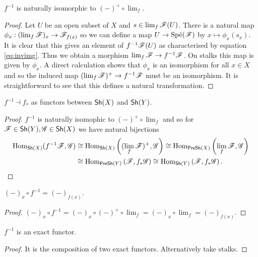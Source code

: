 \documentclass{memoir}
\begin{document}
\begin{thm}
    $f^{-1}$ is naturally isomorphic to $(-)^+\circ \lim_f$.
\end{thm}
\begin{proof}
    Let $U$ be an open subset of $X$ and $s\in\lim_f\mathscr{F}(U)$.
    There is a natural map $\phi_x:(\lim_f\mathscr{F})_x\to\mathscr{F}_{f(x)}$ so we can define a map $U\to\text{Sp\'e}(\mathscr{F})$ by $x\mapsto \phi_x(s_x)$.
    It is clear that this gives an element of $f^{-1}\mathscr{F}(U)$ as characterised by equation \ref{eq:invimg}.
    Thus we obtain a morphism $\lim_f\mathscr{F}\to f^{-1}\mathscr{F}$.
    On stalks this map is given by $\phi_x$.
    A direct calculation shows that $\phi_x$ is an isomorphism for all $x\in X$ and so the induced map $(\lim_f\mathscr{F})^+\to f^{-1}\mathscr{F}$ must be an isomorphism.
    It is straightforward to see that this defines a natural transformation.
\end{proof}
\begin{corollary}
    $f^{-1}\dashv f_*$ as functors between ${\normalfont\mathsf{Sh}}(X)$ and ${\normalfont\mathsf{Sh}}(Y)$.
\end{corollary}
\begin{proof}
    $f^{-1}$ is naturally isomophic to $(-)^+\circ \lim_f$ and so for $\mathscr{F}\in{\normalfont\mathsf{Sh}}(Y),\mathscr{G}\in{\normalfont\mathsf{Sh}}(X)$ we have natural bijections
    \begin{align}
        \operatorname{Hom}_{{\normalfont\mathsf{Sh}}(X)}(f^{-1}\mathscr{F},\mathscr{G}) &\cong \operatorname{Hom}_{{\normalfont\mathsf{Sh}}(X)}\left((\lim_f\mathscr{F})^+,\mathscr{G}\right) \cong \operatorname{Hom}_{{\normalfont\mathsf{PreSh}}(X)}\left(\lim_f\mathscr{F},\mathscr{G}\right) \nonumber \\
                                             &\cong \operatorname{Hom}_{{\normalfont\mathsf{PreSh}}(Y)}\left(\mathscr{F},f_*\mathscr{G}\right) \cong \operatorname{Hom}_{{\normalfont\mathsf{Sh}}(Y)}\left(\mathscr{F},f_*\mathscr{G}\right).
    \end{align}
\end{proof}
\begin{corollary}
    $(-)_x\circ f^{-1} = (-)_{f(x)}$.
\end{corollary}
\begin{proof}
    $(-)_x\circ f^{-1} = (-)_x \circ (-)^+ \circ \lim_f = (-)_x \circ \lim_f = (-)_{f(x)}$.
\end{proof}
\begin{corollary}
    $f^{-1}$ is an exact functor.
\end{corollary}
\begin{proof}
    It is the composition of two exact functors.
    Alternatively take stalks.
\end{proof}
\end{document}
